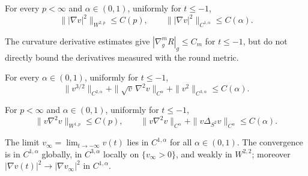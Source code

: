\begin{lemma}
\label{lem:chow-iv-pressure-gradient-regularity}


For every \(p<\infty\) and \(\alpha\in(0,1)\), uniformly for \(t\le-1\),
\[
 \bigl\||\nabla v|^2\bigr\|_{W^{2,p}}\le C(p),\qquad
 \bigl\||\nabla v|^2\bigr\|_{C^{1,\alpha}}\le C(\alpha).
\]
\end{lemma}

\begin{remark}
\label{rem:chow-iv-intrinsic-curvature-derivatives}

The curvature derivative estimates give
\(|\nabla_g^mR|_g\le C_m\) for \(t\le-1\), but do not directly bound the
derivatives measured with the round metric.
\end{remark}

\begin{lemma}
\label{lem:chow-iv-weighted-higher-pressure-estimates}


For every \(\alpha\in(0,1)\), uniformly for \(t\le-1\),
\[
 \|v^{3/2}\|_{C^{2,\alpha}}+
 \|\sqrt v\,\nabla^2v\|_{C^\alpha}+
 \|v^2\|_{C^{3,\alpha}}\le C(\alpha).
\]
\end{lemma}

\begin{lemma}
\label{lem:chow-iv-weighted-pressure-hessian}


For \(p<\infty\) and \(\alpha\in(0,1)\), uniformly for \(t\le-1\),
\[
 \|v\nabla^2v\|_{W^{1,p}}\le C(p),\qquad
 \|v\nabla^2v\|_{C^\alpha}+\|v\Delta_{S^2}v\|_{C^\alpha}\le C(\alpha).
\]
\end{lemma}

\begin{lemma}
\label{lem:chow-iv-backward-pressure-convergence}


The limit \(v_\infty=\lim_{t\to-\infty}v(t)\) lies in
\(C^{1,\alpha}\) for all \(\alpha\in(0,1)\).  The convergence is in
\(C^{1,\alpha}\) globally, in \(C^{3,\alpha}\) locally on
\(\{v_\infty>0\}\), and weakly in \(W^{2,2}\); moreover
\(|\nabla v(t)|^2\to|\nabla v_\infty|^2\) in \(C^{1,\alpha}\).
\end{lemma}

